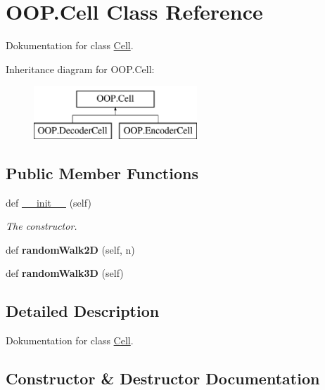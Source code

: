 \hypertarget{class_o_o_p_1_1_cell}{}\section{O\+O\+P.\+Cell Class Reference}
\label{class_o_o_p_1_1_cell}


Dokumentation for class \mbox{\hyperlink{class_o_o_p_1_1_cell}{Cell}}.  


Inheritance diagram for O\+O\+P.\+Cell\+:\begin{figure}[H]
\begin{center}
\leavevmode
\includegraphics[height=2.000000cm]{class_o_o_p_1_1_cell}
\end{center}
\end{figure}
\subsection*{Public Member Functions}
\begin{DoxyCompactItemize}
\item 
def \mbox{\hyperlink{class_o_o_p_1_1_cell_ab1a324a4456c36a49868ba26cd76eb39}{\+\_\+\+\_\+init\+\_\+\+\_\+}} (self)
\begin{DoxyCompactList}\small\item\em The constructor. \end{DoxyCompactList}\item 
\mbox{\label{class_o_o_p_1_1_cell_a43bf87982f526ebdcf3334ab9d9038fd}} 
def {\bfseries random\+Walk2D} (self, n)
\item 
\mbox{\label{class_o_o_p_1_1_cell_ade9b333c2663aed86972a68048c7abb4}} 
def {\bfseries random\+Walk3D} (self)
\end{DoxyCompactItemize}


\subsection{Detailed Description}
Dokumentation for class \mbox{\hyperlink{class_o_o_p_1_1_cell}{Cell}}. 



\subsection{Constructor \& Destructor Documentation}
\mbox{\label{class_o_o_p_1_1_cell_ab1a324a4456c36a49868ba26cd76eb39}} 
